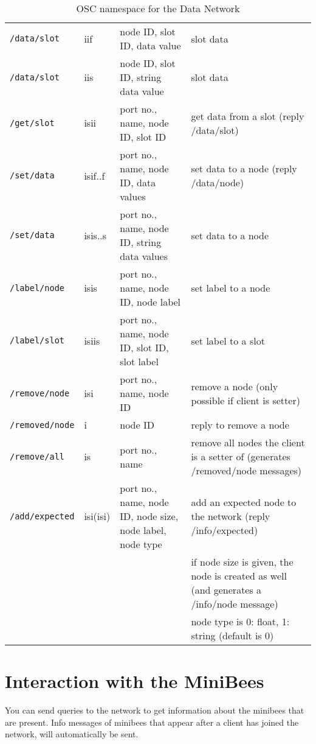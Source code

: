 \documentclass[letterpaper,10pt]{article}
\begin{document}
\begin{sidewaystable}[!tbp]
\begin{center}
\begin{tabular}{|llll|}
\verb|/data/slot| & iif & node ID, slot ID, data value & slot data \\
\verb|/data/slot| & iis & node ID, slot ID, string data value & slot data \\
\verb|/get/slot| & isii & port no., name, node ID, slot ID & get data from a slot (reply /data/slot) \\

\verb|/set/data| & isif..f & port no., name, node ID, data values & set data to a node (reply /data/node)\\
\verb|/set/data| & isis..s & port no., name, node ID, string data values & set data to a node\\

\verb|/label/node| & isis & port no., name, node ID, node label & set label to a node \\
\verb|/label/slot| & isiis & port no., name, node ID, slot ID, slot label & set label to a slot \\

\verb|/remove/node| & isi & port no., name, node ID & remove a node (only possible if client is setter) \\
\verb|/removed/node| & i & node ID & reply to remove a node \\
\verb|/remove/all| & is & port no., name & remove all nodes the client is a setter of (generates /removed/node messages) \\

\verb|/add/expected| & isi(isi) & port no., name, node ID, node size, node label, node type & add an expected node to the network (reply /info/expected) \\
 &  &  & if node size is given, the node is created as well (and generates a /info/node message) \\
 &  &  & node type is 0: float, 1: string (default is 0) \\
\hline
\end{tabular}
\end{center}
\caption{OSC namespace for the Data Network}
\label{oscinterface}
\end{sidewaystable}

\section{Interaction with the MiniBees}

You can send queries to the network to get information about the minibees that are present. Info messages of minibees that appear after a client has joined the network, will automatically be sent.
\end{document}
